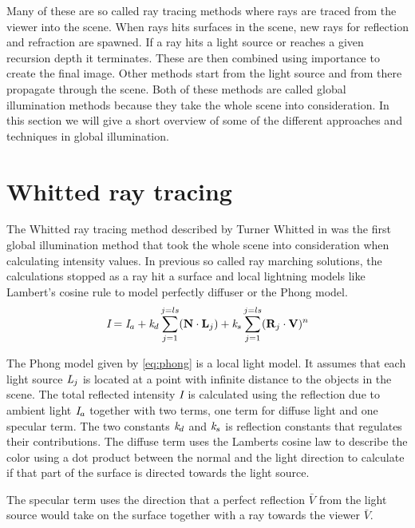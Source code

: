 \documentclass[a4paper, 12pt]{report}
\begin{document}
Many of these are so called ray tracing methods where rays are traced from the viewer into the scene.
When rays hits surfaces in the scene, new rays for reflection and refraction are spawned.
If a ray hits a light source or reaches a given recursion depth it terminates.
These are then combined using importance to create the final image.
Other methods start from the light source and from there propagate through the scene.
Both of these methods are called global illumination methods because they take the whole scene into consideration.
In this section we will give a short overview of some of the different approaches and techniques in global illumination.

\section{Whitted ray tracing}
The Whitted ray tracing method described by Turner Whitted in \cite{Foley_animproved} was the first global illumination method that took the whole scene into consideration when calculating intensity values.
In previous so called ray marching solutions, the calculations stopped as a ray hit a surface and local lightning models like Lambert's cosine rule to model perfectly diffuser or the Phong model. \\

\begin{equation} \label{eq:phong}
\emph{I} = \emph{I}_{a} + \emph{k}_{d} \sum_{j=1}^{j=ls} (  \mathbf{N} \cdot \mathbf{L}_j) + \emph{k}_{s} \sum_{j=1}^{j=ls} (  \mathbf{R}_j \cdot \mathbf{V})^n
\end{equation}

The Phong model given by \autoref{eq:phong} is a local light model.
It assumes that each light source $\emph{L}_j$ is located at a point with infinite distance to the objects in the scene. 
The total reflected intensity $\emph{I}$ is calculated using the reflection due to ambient light $\emph{I}_{a}$ together with two terms, one term for diffuse light and one specular term.
The two constants $\emph{k}_{d}$ and $\emph{k}_{s}$ is reflection constants that regulates their contributions.
The diffuse term uses the Lamberts cosine law to describe the color using a dot product between the normal and the light direction to calculate if that part of the surface is directed towards the light source.

The specular term uses the direction that a perfect reflection $ \bar{V} $ from the light source would take on the surface together with a ray towards the viewer $\bar{V}$.\\
\end{document}
